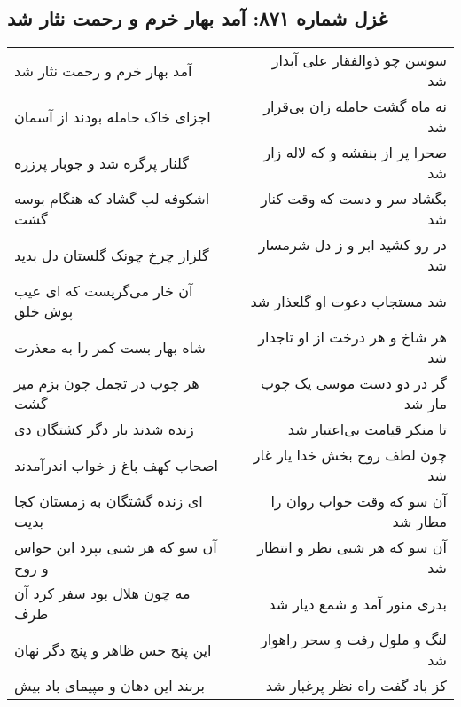 \begin{center}
\section*{غزل شماره ۸۷۱: آمد بهار خرم و رحمت نثار شد}
\label{sec:0871}
\begin{longtable}{l p{0.5cm} r}
آمد بهار خرم و رحمت نثار شد
&&
سوسن چو ذوالفقار علی آبدار شد
\\
اجزای خاک حامله بودند از آسمان
&&
نه ماه گشت حامله زان بی‌قرار شد
\\
گلنار پرگره شد و جوبار پرزره
&&
صحرا پر از بنفشه و که لاله زار شد
\\
اشکوفه لب گشاد که هنگام بوسه گشت
&&
بگشاد سر و دست که وقت کنار شد
\\
گلزار چرخ چونک گلستان دل بدید
&&
در رو کشید ابر و ز دل شرمسار شد
\\
آن خار می‌گریست که ای عیب پوش خلق
&&
شد مستجاب دعوت او گلعذار شد
\\
شاه بهار بست کمر را به معذرت
&&
هر شاخ و هر درخت از او تاجدار شد
\\
هر چوب در تجمل چون بزم میر گشت
&&
گر در دو دست موسی یک چوب مار شد
\\
زنده شدند بار دگر کشتگان دی
&&
تا منکر قیامت بی‌اعتبار شد
\\
اصحاب کهف باغ ز خواب اندرآمدند
&&
چون لطف روح بخش خدا یار غار شد
\\
ای زنده گشتگان به زمستان کجا بدیت
&&
آن سو که وقت خواب روان را مطار شد
\\
آن سو که هر شبی بپرد این حواس و روح
&&
آن سو که هر شبی نظر و انتظار شد
\\
مه چون هلال بود سفر کرد آن طرف
&&
بدری منور آمد و شمع دیار شد
\\
این پنج حس ظاهر و پنج دگر نهان
&&
لنگ و ملول رفت و سحر راهوار شد
\\
بربند این دهان و مپیمای باد بیش
&&
کز باد گفت راه نظر پرغبار شد
\\
\end{longtable}
\end{center}
